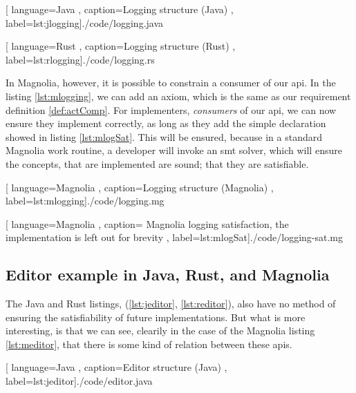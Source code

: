 \begin{center}
  
    [ language=Java
    , caption={Logging structure (Java)}
    , label=lst:jlogging]{./code/logging.java}
\end{center}

\begin{center}
  
    [ language=Rust
    , caption={Logging structure (Rust)}
    , label=lst:rlogging]{./code/logging.rs}
\end{center}

In Magnolia, however, it is possible to constrain a consumer of our \gls*{api}.
In the listing \ref{lst:mlogging}, we can add an axiom, which is the same as our
requirement definition \ref{def:actComp}. For implementers, \textit{consumers}
of our \gls*{api}, we can now ensure they implement correctly, as long as they
add the simple declaration showed in listing \ref{lst:mlogSat}. This will be
ensured, because in a standard Magnolia work routine, a developer will invoke an
\gls*{smt} solver, which will ensure the concepts, that are implemented are
sound; that they are satisfiable.

\begin{center}
  
    [ language=Magnolia
    , caption={Logging structure (Magnolia)}
    , label=lst:mlogging]{./code/logging.mg}
\end{center}

\begin{center}
  
    [ language=Magnolia
    , caption={
        Magnolia logging satisfaction, the implementation is left out for
        brevity
      }
    , label=lst:mlogSat]{./code/logging-sat.mg}
\end{center}

\subsection{Editor example in Java, Rust, and Magnolia}

The Java and Rust listings, (\ref{lst:jeditor}, \ref{lst:reditor}), also have no
method of ensuring the satisfiability of future implementations. But what is
more interesting, is that we can see, clearily in the case of the Magnolia
listing \ref{lst:meditor}, that there is some kind of relation between these
\gls*{api}s.

\begin{code}[H]
  
    [ language=Java
    , caption={Editor structure (Java)}
    , label=lst:jeditor]{./code/editor.java}
\end{code}

